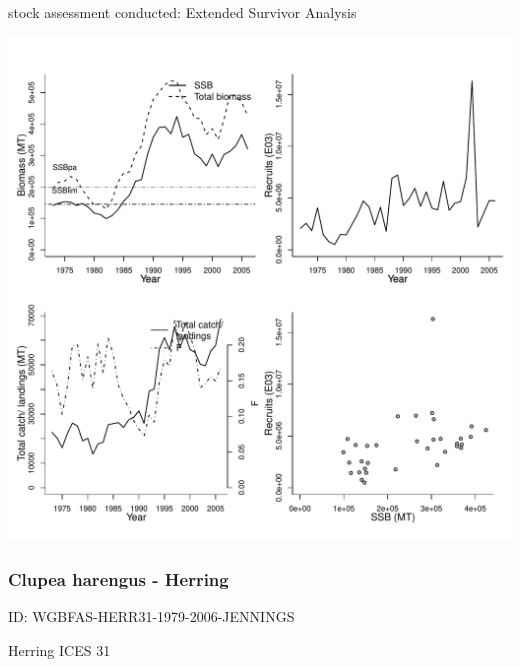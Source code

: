 stock assessment conducted: Extended Survivor Analysis 
\begin{center}
\vspace{-0.2cm}\includegraphics[scale=0.65]{../tex/figures/plot-WGBFAS-HERR30-1972-2007-JENNINGS.pdf}
\end{center}

\newpage
\subsubsection{Clupea harengus - Herring}
ID: WGBFAS-HERR31-1979-2006-JENNINGS

Herring ICES 31 

